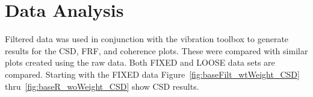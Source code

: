 \documentclass[paper=a4, fontsize=12pt]{scrartcl} %
\begin{document}
\section*{Data Analysis}
Filtered data was used in conjunction with the vibration toolbox to generate results for the CSD, FRF, and coherence plots. These were compared with similar plots created using the raw data. Both FIXED and LOOSE data sets are compared. Starting with the FIXED data Figure~\ref{fig:baseFilt_wtWeight_CSD} thru~\ref{fig:baseR_woWeight_CSD} show CSD results.
%
	\begin{figure}[H]
		\centering
		\quad
\end{figure}
\end{document}
